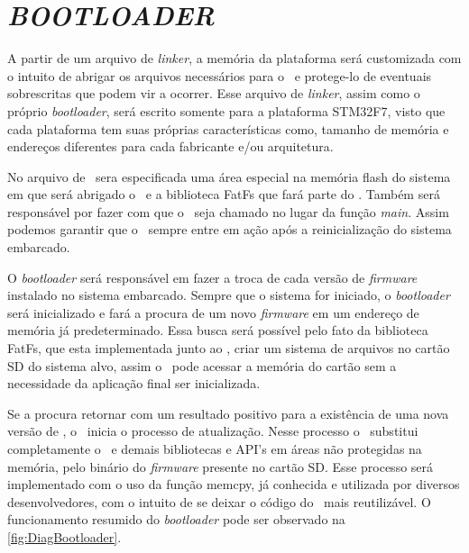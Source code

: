 \section{\textit{BOOTLOADER}}
\label{sec:Bootloader}

A partir de um arquivo de \textit{linker}, a memória da plataforma será customizada com o intuito de abrigar os arquivos necessários para o \bootloader\ e protege-lo de eventuais sobrescritas que podem vir a ocorrer. Esse arquivo de \textit{linker}, assim como o próprio \textit{bootloader}, será escrito somente para a plataforma STM32F7, visto que cada plataforma tem suas próprias características como, tamanho de memória e endereços diferentes para cada fabricante e/ou arquitetura.

No arquivo de \linker\ sera especificada uma área especial na memória flash do sistema em que será abrigado o \bootloader\ e a biblioteca FatFs que fará parte do \bootloader. Também será responsável por fazer com que o \bootloader\ seja chamado no lugar da função \textit{main}. Assim podemos garantir que o \bootloader\ sempre entre em ação após a reinicialização do sistema embarcado.


O \textit{bootloader} será responsável em fazer a troca de cada versão de \textit{firmware} instalado no sistema embarcado. Sempre que o sistema for iniciado, o \textit{bootloader} será inicializado e fará a procura de um novo \textit{firmware} em um endereço de memória já predeterminado. Essa busca será possível pelo fato da biblioteca FatFs, que esta implementada junto ao \bootloader, criar um sistema de arquivos no cartão SD do sistema alvo, assim o \bootloader\ pode acessar a memória do cartão sem a necessidade da aplicação final ser inicializada.

Se a procura retornar com um resultado positivo para a existência de uma nova versão de \software, o \bootloader\ inicia o processo de atualização. Nesse processo o \bootloader\ substitui completamente o \software\ e demais bibliotecas e API's em áreas não protegidas na memória, pelo binário do \textit{firmware} presente no cartão SD. Esse processo será implementado com o uso da função memcpy, já conhecida e utilizada por diversos desenvolvedores, com o intuito de se deixar o código do \bootloader\ mais reutilizável. O funcionamento resumido do \textit{bootloader} pode ser observado na \autoref{fig:DiagBootloader}.

